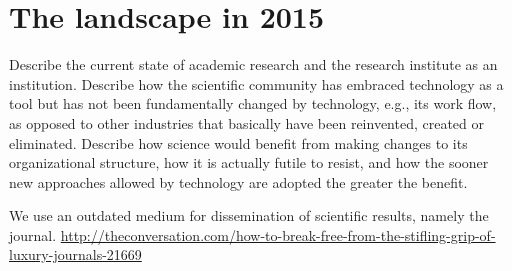 \section{The landscape in 2015}
Describe the current state of academic research and the research institute as an institution. Describe how the scientific community has embraced technology as a tool but has not been fundamentally changed by technology, e.g., its work flow, as opposed to other industries that basically have been reinvented, created or eliminated. Describe how science would benefit from making changes to its organizational structure, how it is actually futile to resist, and how the sooner new approaches allowed by technology are adopted the greater the benefit.

We use an outdated medium for dissemination of scientific results, namely the journal. \url{http://theconversation.com/how-to-break-free-from-the-stifling-grip-of-luxury-journals-21669} 